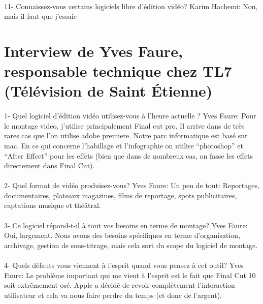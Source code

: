 \paragraph{}
11- Connaissez-vous certains logiciels libre d'édition vidéo?
Karim Hachemi: Non, mais il faut que j'essaie

\section*{Interview de Yves Faure, responsable technique chez TL7
(Télévision de Saint Étienne)}

\paragraph{}
1-  Quel logiciel d'édition vidéo utilisez-vous à l'heure actuelle ?
Yves Faure: Pour le montage video, j'utilise principalement Final cut pro. Il
arrive dans de très rares cas que l'on utilise adobe premiere. Notre
parc informatique est basé sur mac. En ce qui concerne l'habillage et
l'infographie on utilise ``photoshop'' et  ``After Effect'' pour les effets (bien
que dans de nombreux cas, on fasse les effets directement dans Final Cut).

\paragraph{}
2- Quel format de vidéo produisez-vous?
Yves Faure: Un peu de tout: Reportages, documentaires, plateaux magazines, films de reportage, spots
publicitaires, captations musique et théâtral.

\paragraph{}
3- Ce logiciel répond-t-il à tout vos besoins en terme de montage?
Yves Faure: Oui, largement. Nous avons des besoins spécifiques en terme d'organisation,
archivage, gestion de sous-titrage, mais cela sort du scope du logiciel de
montage.

\paragraph{}
4- Quels défauts vous viennent à l'esprit quand vous pensez à cet outil?
Yves Faure: Le problème important qui me vient à l'esprit est le fait que Final Cut 10 soit
extrêmement osé. Apple a décidé de revoir complètement l'interaction
utilisateur et cela va nous faire perdre du temps (et donc de l'argent).

